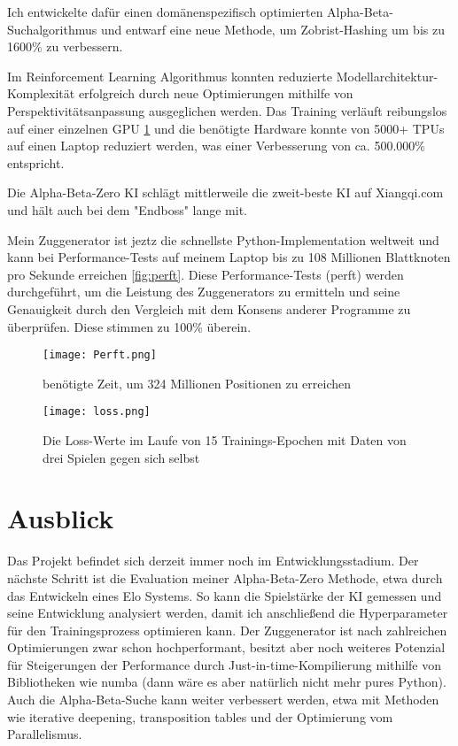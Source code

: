 \documentclass{jpp}
\begin{document}
Ich entwickelte dafür einen domänenspezifisch optimierten Alpha-Beta-Suchalgorithmus und entwarf eine neue Methode, um Zobrist-Hashing um bis zu 1600\% zu verbessern. 

Im Reinforcement Learning Algorithmus konnten reduzierte Modellarchitektur-Komplexität erfolgreich durch neue Optimierungen mithilfe von Perspektivitätsanpassung ausgeglichen werden. Das Training verläuft reibungslos auf einer einzelnen GPU \ref{fig:loss} und die benötigte Hardware konnte von 5000+ TPUs auf einen Laptop reduziert werden, was einer Verbesserung von ca. 500.000\% entspricht.

Die Alpha-Beta-Zero KI schlägt mittlerweile die zweit-beste KI auf Xiangqi.com und hält auch bei dem "Endboss" lange mit.

Mein Zuggenerator ist jeztz die schnellste Python-Implementation weltweit und kann bei Performance-Tests auf meinem Laptop bis zu 108 Millionen Blattknoten pro Sekunde erreichen \ref{fig:perft}. Diese Performance-Tests (perft) werden durchgeführt, um die Leistung des Zuggenerators zu ermitteln und seine Genauigkeit durch den Vergleich mit dem Konsens anderer Programme zu überprüfen. Diese stimmen zu 100\% überein. 

\begin{figure}
  \centering
  \begin{minipage}{0.45\textwidth}
    \texttt{[image: Perft.png]}
    \caption{benötigte Zeit, um 324 Millionen Positionen zu erreichen}
    \label{fig:perft}
  \end{minipage}
  \hfill
  \begin{minipage}{0.54\textwidth}
  \texttt{[image: loss.png]}
  \caption{Die Loss-Werte im Laufe von 15 Trainings-Epochen mit Daten von drei Spielen gegen sich selbst}
  \label{fig:loss}
  \end{minipage}
\end{figure}

\section{Ausblick}
Das Projekt befindet sich derzeit immer noch im Entwicklungsstadium. Der nächste Schritt ist die Evaluation meiner Alpha-Beta-Zero Methode, etwa durch das Entwickeln eines Elo Systems. So kann die Spielstärke der KI gemessen und seine Entwicklung analysiert werden, damit ich anschließend die Hyperparameter für den Trainingsprozess optimieren kann.
Der Zuggenerator ist nach zahlreichen Optimierungen zwar schon hochperformant, besitzt aber noch weiteres Potenzial für Steigerungen der Performance durch Just-in-time-Kompilierung mithilfe von Bibliotheken wie numba (dann wäre es aber natürlich nicht mehr pures Python). Auch die Alpha-Beta-Suche kann weiter verbessert werden, etwa mit Methoden wie iterative deepening, transposition tables und der Optimierung vom Parallelismus.
\end{document}
